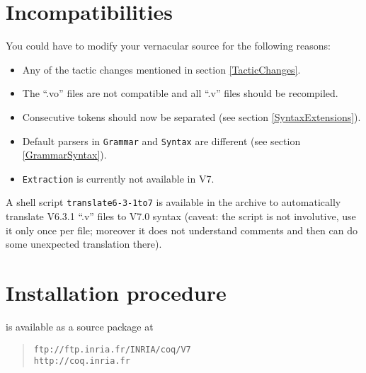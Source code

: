 \documentclass[11pt]{article}
\begin{document}
\section{Incompatibilities}
\label{Incompatibilities}

  You could have to modify your vernacular source for the following
  reasons:

  \begin{itemize}
 
  \item Any of the tactic changes mentioned in section \ref{TacticChanges}.

  \item The ``.vo'' files are not compatible and all ``.v'' files should
  be recompiled.

  \item Consecutive tokens should now be separated (see section
  \ref{SyntaxExtensions}).

  \item Default parsers in {\tt Grammar} and {\tt Syntax} are
  different (see section \ref{GrammarSyntax}).

  \item {\tt Extraction} is currently not available in {\Coq} V7.

  \end{itemize}

A shell script \verb=translate6-3-1to7= is available in the archive to
automatically translate V6.3.1 ``.v'' files to V7.0 syntax (caveat:
the script is not involutive, use it only once per file; moreover it
does not understand comments and then can do some unexpected
translation there).


\section{Installation procedure}


{\Coq} is available as a source package at 

\begin{quote}
\verb|ftp://ftp.inria.fr/INRIA/coq/V7|\\
\verb|http://coq.inria.fr|
\end{quote}
\end{document}
